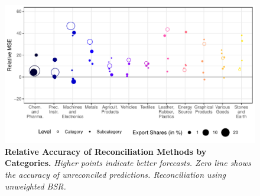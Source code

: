 \documentclass[a4paper,fleqn,11pt]{article}
\begin{document}
\begin{figure}[H]
	\includegraphics[width=\textwidth]{fig/fig_eval_categories}
	\caption[Relative Accuracy of Reconciliation Methods by Categories]{\textbf{Relative Accuracy of Reconciliation Methods by Categories.} \small{\textit{Higher points indicate better forecasts. Zero line shows the accuracy of unreconciled predictions. Reconciliation using unweighted BSR.}}}\label{fig:eval_categories}
\end{figure}
\end{document}
